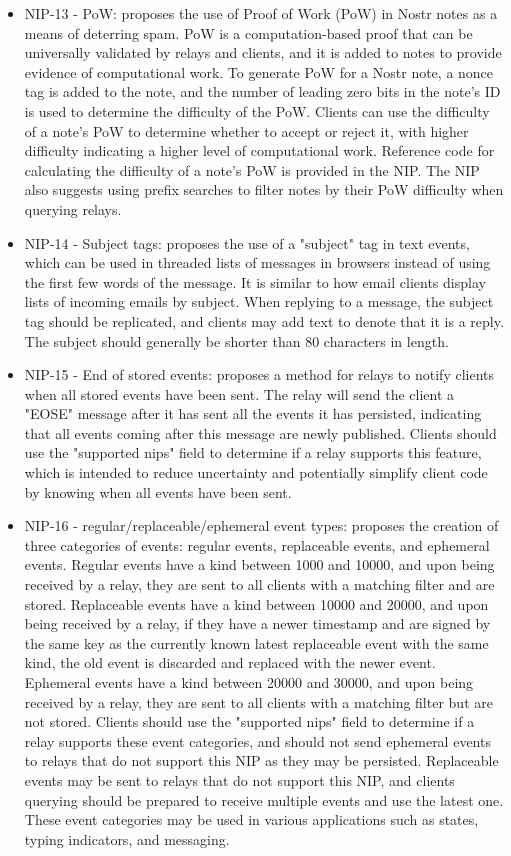 \begin{itemize}
\item NIP-13 - PoW: proposes the use of Proof of Work (PoW) in Nostr notes as a means of deterring spam. PoW is a computation-based proof that can be universally validated by relays and clients, and it is added to notes to provide evidence of computational work. To generate PoW for a Nostr note, a nonce tag is added to the note, and the number of leading zero bits in the note's ID is used to determine the difficulty of the PoW. Clients can use the difficulty of a note's PoW to determine whether to accept or reject it, with higher difficulty indicating a higher level of computational work. Reference code for calculating the difficulty of a note's PoW is provided in the NIP. The NIP also suggests using prefix searches to filter notes by their PoW difficulty when querying relays.
\item NIP-14 - Subject tags: proposes the use of a "subject" tag in text events, which can be used in threaded lists of messages in browsers instead of using the first few words of the message. It is similar to how email clients display lists of incoming emails by subject. When replying to a message, the subject tag should be replicated, and clients may add text to denote that it is a reply. The subject should generally be shorter than 80 characters in length.
\item NIP-15 - End of stored events: proposes a method for relays to notify clients when all stored events have been sent. The relay will send the client a "EOSE" message after it has sent all the events it has persisted, indicating that all events coming after this message are newly published. Clients should use the "supported nips" field to determine if a relay supports this feature, which is intended to reduce uncertainty and potentially simplify client code by knowing when all events have been sent.
\item NIP-16 - regular/replaceable/ephemeral event types: proposes the creation of three categories of events: regular events, replaceable events, and ephemeral events. Regular events have a kind between 1000 and 10000, and upon being received by a relay, they are sent to all clients with a matching filter and are stored. Replaceable events have a kind between 10000 and 20000, and upon being received by a relay, if they have a newer timestamp and are signed by the same key as the currently known latest replaceable event with the same kind, the old event is discarded and replaced with the newer event. Ephemeral events have a kind between 20000 and 30000, and upon being received by a relay, they are sent to all clients with a matching filter but are not stored. Clients should use the "supported nips" field to determine if a relay supports these event categories, and should not send ephemeral events to relays that do not support this NIP as they may be persisted. Replaceable events may be sent to relays that do not support this NIP, and clients querying should be prepared to receive multiple events and use the latest one. These event categories may be used in various applications such as states, typing indicators, and messaging.

\end{itemize}
